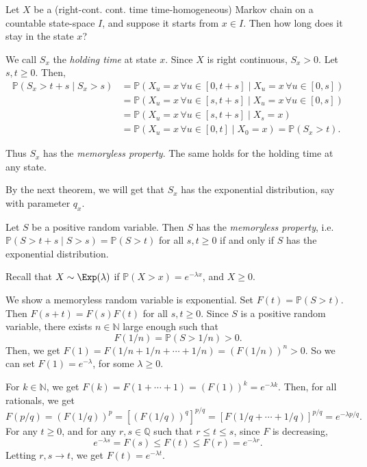 \documentclass[12pt]{article}
\begin{document}
Let $X$ be a (right-cont. cont. time time-homogeneous) Markov chain on a countable state-space $I$, and suppose it starts from $x \in I$. Then how long does it stay in the state $x$?

We call $S_x$ the \emph{holding time} at state $x$. Since $X$ is right continuous, $S_x > 0$. Let $s, t \geq 0$. Then,
\begin{align*}
	\mathbb{P}(S_x > t + s \mid S_x > s) &= \mathbb{P}(X_u = x \, \forall u \in [0, t+s] \mid X_u = x \, \forall u \in [0,s]) \\
					     &= \mathbb{P}(X_u = x \, \forall u \in [s, t+s] \mid X_u = x \, \forall u \in [0, s]) \\
					     &= \mathbb{P}(X_u = x \, \forall u \in [s, t+s] \mid X_s = x) \\
					     &= \mathbb{P}(X_u = x \, \forall u \in [0, t] \mid X_0 = x) = \mathbb{P}(S_x > t).
\end{align*}

Thus $S_x$ has the \emph{memoryless property}. The same holds for the holding time at any state.

By the next theorem, we will get that $S_x$ has the exponential distribution, say with parameter $q_{x}$.

\begin{theorem}
	Let $S$ be a positive random variable. Then $S$ has the \emph{memoryless property}, i.e. $\mathbb{P}(S > t+s \mid S > s) = \mathbb{P}(S > t)$ for all $s, t \geq 0$ if and only if $S$ has the exponential distribution.
\end{theorem}

Recall that $X \sim \Exp(\lambda)$ if $\mathbb{P}(X > x) = e^{-\lambda x}$, and $X \geq 0$.

\begin{proofbox}
	We show a memoryless random variable is exponential. Set $F(t) = \mathbb{P}(S > t)$. Then $F(s + t) = F(s)F(t)$ for all $s, t \geq 0$. Since $S$ is a positive random variable, there exists $n \in \mathbb{N}$ large enough such that
	\[
	F(1/n) = \mathbb{P}(S > 1/n) > 0
	.\]
	Then, we get $F(1) = F(1/n + 1/n + \cdots + 1/n) = (F(1/n))^{n} > 0$. So we can set $F(1) = e^{-\lambda}$, for some $\lambda \geq 0$.

	For $k \in \mathbb{N}$, we get $F(k) = F(1 + \cdots + 1) = (F(1))^{k} = e^{-\lambda k}$. Then, for all rationals, we get
	\[
		F(p/q) = (F(1/q))^{p} = [(F(1/q))^{q}]^{p/q} = [F(1/q + \cdots + 1/q)]^{p/q} = e^{-\lambda p/q}
	.\]
	For any $t \geq 0$, and for any $r, s \in \mathbb{Q}$ such that $r \leq t \leq s$, since $F$ is decreasing,
	\[
	e^{-\lambda s} = F(s) \leq F(t) \leq F(r) = e^{-\lambda r}
	.\]
	Letting $r, s \to t$, we get $F(t) = e^{-\lambda t}$.
\end{proofbox}
\end{document}
